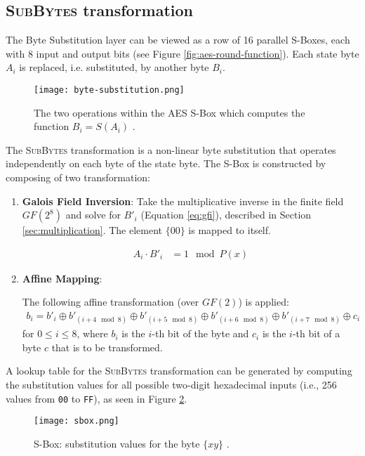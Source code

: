 \subsection{\textsc{SubBytes} transformation}
\label{sec:SubBytes}

The Byte Substitution layer can be viewed as a row of 16 parallel S-Boxes, each with 8 input and output bits (see Figure \ref{fig:aes-round-function}). 
Each state byte $A_i$ is replaced, i.e. substituted, by another byte $B_i$.

\begin{figure}[!ht] 
    \centering
    \texttt{[image: byte-substitution.png]} 
    \caption{
        The two operations within the AES S-Box which computes the function $B_i = S(A_i)$ \cite{Paar2024}.
    }
    \label{fig:byte-substitution} 
\end{figure}

The \textsc{SubBytes} transformation is a non-linear byte substitution that operates independently on each byte of the state byte.
The S-Box is constructed by composing of two transformation:
\begin{enumerate}
    \item \textbf{Galois Field Inversion}: 
    Take the multiplicative inverse in the finite field $GF(2^8)$ and solve for ${B'}_i$ (Equation \ref{eq:gfi}), described in Section \ref{sec:multiplication}. 
    The element $\{00\}$ is mapped to itself.
    
    \begin{align}
        A_i \cdot {B'}_i &= 1 \mod P(x)
        \label{eq:gfi}
    \end{align}

    \item \textbf{Affine Mapping}:
    
    The following affine transformation (over $GF(2)$) is applied:
    \begin{align}
        b_i = {b'}_i \oplus {b'}_{(i+4 \mod 8)} \oplus {b'}_{(i+5 \mod 8)} \oplus {b'}_{(i+6 \mod 8)} \oplus {b'}_{(i+7 \mod 8)} \oplus c_i
    \end{align}
    for $0 \leq i \leq 8$, where $b_i$ is the $i$-th bit of the byte and $c_i$ is the $i$-th bit of a byte $c$ that is to be transformed.
\end{enumerate}

A lookup table for the \textsc{SubBytes} transformation can be generated by computing the substitution values for all possible two-digit hexadecimal inputs (i.e., 256 values from \texttt{00} to \texttt{FF}), as seen in Figure \ref{fig:sbox}.

\begin{figure}[h]
    \centering
    \texttt{[image: sbox.png]}
    \caption{S-Box: substitution values for the byte $\{xy\}$ \cite{NIST_AES}.}
    \label{fig:sbox}
\end{figure}